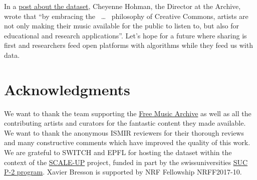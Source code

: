 \documentclass{article}
\begin{document}
In a \href{https://freemusicarchive.org/member/cheyenne_h/blog/FMA_Dataset_for_Researchers}{post about the dataset}, Cheyenne Hohman, the Director at the Archive, wrote that ``by embracing the
~\ldots~%
philosophy of Creative Commons, artists are not only making their music available for the public to listen to, but also for educational and research applications''.
Let's hope for a future where sharing is first and researchers feed open platforms with algorithms while they feed us with data.


\section{Acknowledgments}


We want to thank the team supporting the \href{https://freemusicarchive.org}{Free Music Archive} as well as all the contributing artists and curators for the fantastic content they made available.
We want to thank the anonymous ISMIR reviewers for their thorough reviews and many constructive comments which have improved the quality of this work.
We are grateful to SWITCH and EPFL for hosting the dataset within the context of the \href{https://projects.switch.ch/scale-up}{SCALE-UP} project, funded in part by the swissuniversities \href{http://www.swissuniversities.ch/isci}{SUC P-2 program}.
Xavier Bresson is supported by NRF Fellowship NRFF2017-10.


\end{document}
